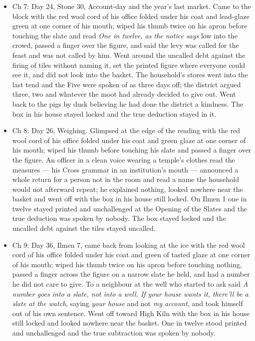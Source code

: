 \documentclass{design/chronicle}
\begin{document}
{\begin{itemize}[leftmargin=1.4em,itemsep=1pt,topsep=3pt,parsep=0pt]
\item Ch 7: Day 24, Stone 30, Account-day and the year’s last market. Came to the block with the red wool cord of his office folded under his coat and lead-glaze green at one corner of his mouth; wiped his thumb twice on his apron before touching the slate and read \emph{One in twelve, as the notice says} low into the crowd, passed a finger over the figure, and said the levy was called for the feast and was not called by him. Went around the uncalled debt against the firing of tiles without naming it, set the printed figure where everyone could see it, and did not look into the basket. The household’s stores went into the last tend and the Five were spoken of as three days off; the district argued three, two and whatever the moot had already decided to give out. Went back to the pigs by dusk believing he had done the district a kindness. The box in his house stayed locked and the true deduction stayed in it.

\end{itemize}

\begin{itemize}[leftmargin=1.4em,itemsep=1pt,topsep=3pt,parsep=0pt]

\item Ch 8: Day 26, Weighing. Glimpsed at the edge of the reading with the red wool cord of his office folded under his coat and green glaze at one corner of his mouth; wiped his thumb before touching his slate and passed a finger over the figure. An officer in a clean voice wearing a temple’s clothes read the measures --- his Cross grammar in an institution’s mouth --- announced a whole return for a person not in the room and read a name the household would not afterward repeat; he explained nothing, looked nowhere near the basket and went off with the box in his house still locked. On Ilmen 1 one in twelve stayed printed and unchallenged at the Opening of the Slates and the true deduction was spoken by nobody. The box stayed locked and the uncalled debt against the tiles stayed uncalled.

\end{itemize}

\begin{itemize}[leftmargin=1.4em,itemsep=1pt,topsep=3pt,parsep=0pt]

\item Ch 9: Day 36, Ilmen 7, came back from looking at the ice with the red wool cord of his office folded under his coat and green of tasted glaze at one corner of his mouth; wiped his thumb twice on his apron before touching nothing, passed a finger across the figure on a narrow slate he held, and had a number he did not care to give. To a neighbour at the well who started to ask said \emph{A number goes into a slate, not into a well. If your house wants it, there’ll be a slate at the watch}, saying \emph{your house} and not \emph{my account}, and took himself out of his own sentence. Went off toward High Kiln with the box in his house still locked and looked nowhere near the basket. One in twelve stood printed and unchallenged and the true subtraction was spoken by nobody.


\end{itemize}}
\end{document}
